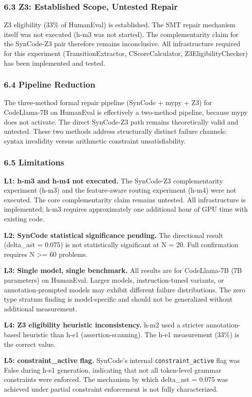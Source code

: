 \subsubsection{6.3 Z3: Established Scope, Untested Repair}

Z3 eligibility (33\% of HumanEval) is established. The SMT repair mechanism itself was not executed (h-m3 was not started). The complementarity claim for the SynCode-Z3 pair therefore remains inconclusive. All infrastructure required for this experiment (TransitionExtractor, CScoreCalculator, Z3EligibilityChecker) has been implemented and tested.

\subsubsection{6.4 Pipeline Reduction}

The three-method formal repair pipeline (SynCode + mypy + Z3) for CodeLlama-7B on HumanEval is effectively a two-method pipeline, because mypy does not activate. The direct SynCode-Z3 path remains theoretically valid and untested. These two methods address structurally distinct failure channels: syntax invalidity versus arithmetic constraint unsatisfiability.

\subsubsection{6.5 Limitations}

\textbf{L1: h-m3 and h-m4 not executed.} The SynCode-Z3 complementarity experiment (h-m3) and the feature-aware routing experiment (h-m4) were not executed. The core complementarity claim remains untested. All infrastructure is implemented; h-m3 requires approximately one additional hour of GPU time with existing code.

\textbf{L2: SynCode statistical significance pending.} The directional result (delta_ast = 0.075) is not statistically significant at N = 20. Full confirmation requires N >= 60 problems.

\textbf{L3: Single model, single benchmark.} All results are for CodeLlama-7B (7B parameters) on HumanEval. Larger models, instruction-tuned variants, or annotation-prompted models may exhibit different failure distributions. The zero type stratum finding is model-specific and should not be generalized without additional measurement.

\textbf{L4: Z3 eligibility heuristic inconsistency.} h-m2 used a stricter annotation-based heuristic than h-e1 (assertion-scanning). The h-e1 measurement (33\%) is the correct value.

\textbf{L5: constraint_active flag.} SynCode's internal \texttt{constraint_active} flag was False during h-e1 generation, indicating that not all token-level grammar constraints were enforced. The mechanism by which delta_ast = 0.075 was achieved under partial constraint enforcement is not fully characterized.
